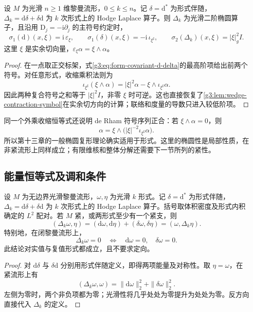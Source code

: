 \begin{proposition}\label{g3:prop:hodge-laplacian-symbol}
	设 \(M\) 为光滑 \(n\ge1\) 维黎曼流形，\(0\le k\le n\)。记 \(\delta=\mathrm d^*\) 为形式伴随，\(\Delta_k=\mathrm d\delta+\delta\mathrm d\) 为 \(k\) 次形式上的 Hodge Laplace 算子。则 \(\Delta_k\) 为光滑二阶椭圆算子，且沿用 \(\mathrm D_j=-\mathrm i\partial_j\) 的主符号约定时，
	\begin{equation}\label{g3:eq:hodge-symbol}
		\sigma_1(\mathrm d)(x,\xi)=\mathrm i\,\varepsilon_\xi,\qquad
		\sigma_1(\delta)(x,\xi)=-\mathrm i\,\iota_{\xi^\sharp},\qquad
		\sigma_2(\Delta_k)(x,\xi)=|\xi|_g^2I.
	\end{equation}
	这里 \(\xi\) 是实余切向量，\(\varepsilon_\xi\alpha=\xi\wedge\alpha\)。
\end{proposition}
\begin{proof}
	在一点取正交标架，式\eqref{g3:eq:form-covariant-d-delta}的最高阶项给出前两个符号。对任意形式，收缩乘积法则为
	\[
		\iota_{\xi^\sharp}(\xi\wedge\alpha)
		=|\xi|^2\alpha-\xi\wedge\iota_{\xi^\sharp}\alpha.
	\]
	因此两种复合符号之和等于 \(|\xi|^2I\)，非零 \(\xi\) 时可逆。这也直接恢复了\cref{g3:lem:wedge-contraction-symbol}在实余切方向的计算；联络和度量的导数只进入较低阶项。
\end{proof}

同一个外乘收缩恒等式还说明 de Rham 符号序列正合：若 \(\xi\wedge\alpha=0\)，则
\[
	\alpha=\xi\wedge\bigl(|\xi|^{-2}\iota_{\xi^\sharp}\alpha\bigr).
\]
所以第十三章的一般椭圆复形理论确实适用于形式。这里的椭圆性是局部性质，在非紧流形上同样成立；有限维核和整体分解还需要下一节所列的紧性。

\subsection{能量恒等式及调和条件}
\label{g3:subsec:1501:03}
\begin{proposition}\label{g3:prop:form-hodge-energy}
	设 \(M\) 为无边界光滑黎曼流形，\(\omega,\eta\) 为光滑 \(k\) 形式。记 \(\delta=\mathrm d^*\) 为形式伴随，\(\Delta_k=\mathrm d\delta+\delta\mathrm d\) 为 \(k\) 次形式上的 Hodge Laplace 算子。括号取体积密度及形式内积确定的 \(L^2\) 配对。若 \(M\) 紧，或两形式至少有一个紧支，则
	\begin{equation}\label{g3:eq:form-hodge-energy}
		(\Delta_k\omega,\eta)
		=(\mathrm d\omega,\mathrm d\eta)+(\delta\omega,\delta\eta)
		=(\omega,\Delta_k\eta).
	\end{equation}
	特别地，在闭黎曼流形上，
	\[
		\Delta_k\omega=0
		\quad\Longleftrightarrow\quad
		\mathrm d\omega=0,\quad\delta\omega=0.
	\]
	此结论对实值与复值形式都成立，且不要求定向。
\end{proposition}
\begin{proof}
	对 \(\mathrm d\delta\) 与 \(\delta\mathrm d\) 分别用形式伴随定义，即得两项能量及对称性。取 \(\eta=\omega\)，在紧流形上有
	\[
		(\Delta_k\omega,\omega)=\|\mathrm d\omega\|_2^2+\|\delta\omega\|_2^2.
	\]
	左侧为零时，两个非负项都为零；光滑性将几乎处处为零提升为处处为零。反方向直接代入 \(\Delta_k\) 的定义。
\end{proof}

